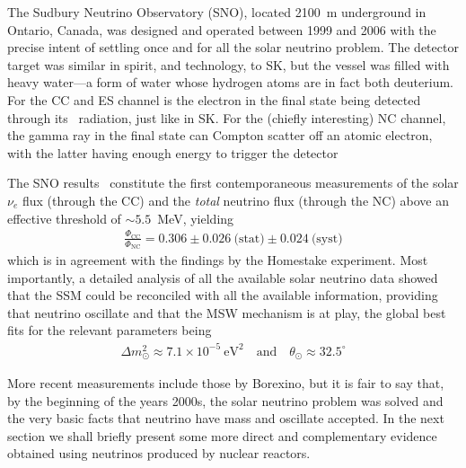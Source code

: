 The Sudbury Neutrino Observatory (SNO), located 2100~m underground in Ontario, Canada,
was designed and operated between 1999 and 2006 with the precise intent of settling once
and for all the solar neutrino problem. The detector target was similar in spirit,
and technology, to SK, but the vessel was filled with heavy water---a form of water
whose hydrogen atoms are in fact both deuterium. For the CC and ES channel is the electron
in the final state being detected through its \cherenkov\ radiation, just like in
SK. For the (chiefly interesting) NC channel, the gamma ray in the final state can
Compton scatter off an atomic electron, with the latter having enough energy to trigger
the detector

The SNO results~\cite{2004PhRvL..92r1301A} constitute the first contemporaneous
measurements of the solar $\nu_e$ flux (through the CC) and the \emph{total} neutrino
flux (through the NC) above an effective threshold of $\sim 5.5$~MeV, yielding
\begin{align*}
  \frac{\Phi_\text{CC}}{\Phi_\text{NC}} = 0.306 \pm 0.026~\text{(stat)} \pm 0.024~\text{(syst)}
\end{align*}
which is in agreement with the findings by the Homestake experiment. Most importantly,
a detailed analysis of all the available solar neutrino data showed that the SSM
could be reconciled with all the available information, providing that neutrino
oscillate and that the MSW mechanism is at play, the global best fits for the relevant
parameters being
\begin{align}
  \Delta m^2_\odot \approx 7.1 \times 10^{-5}~\text{eV}^2
  \quad\text{and}\quad
  \theta_\odot \approx 32.5^\circ
\end{align}


More recent measurements include those by Borexino, but it is fair to say that, by
the beginning of the years 2000s, the solar neutrino problem was solved and the
very basic facts that neutrino have mass and oscillate accepted. In the next section
we shall briefly present some more direct and complementary evidence obtained using
neutrinos produced by nuclear reactors.


